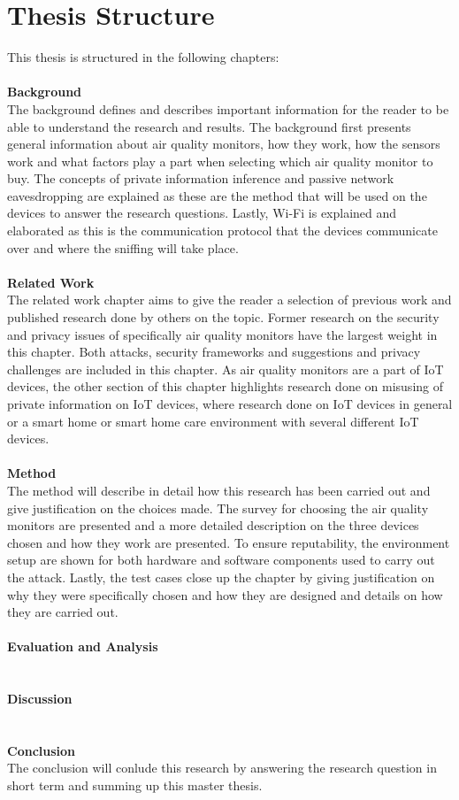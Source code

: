 \section{Thesis Structure}
This thesis is structured in the following chapters:\\\\
\textbf{Background}
\\
The background defines and describes important information for the reader to be able to understand the research and results. The background first presents general information about air quality monitors, how they work, how the sensors work and what factors play a part when selecting which air quality monitor to buy. The concepts of private information inference and passive network eavesdropping are explained as these are the method that will be used on the devices to answer the research questions. Lastly, Wi-Fi is explained and elaborated as this is the communication protocol that the devices communicate over and where the sniffing will take place. 
\\\\
\textbf{Related Work}
\\
The related work chapter aims to give the reader a selection of previous work and published research done by others on the topic. Former research on the security and privacy issues of specifically air quality monitors have the largest weight in this chapter. Both attacks, security frameworks and suggestions and privacy challenges are included in this chapter. As air quality monitors are a part of IoT devices, the other section of this chapter highlights research done on misusing of private information on IoT devices, where research done on IoT devices in general or a smart home or smart home care environment with several different IoT devices. 
\\\\
\textbf{Method}
\\
The method will describe in detail how this research has been carried out and give justification on the choices made. The survey for choosing the air quality monitors are presented and a more detailed description on the three devices chosen and how they work are presented. To ensure reputability, the environment setup are shown for both hardware and software components used to carry out the attack. Lastly, the test cases close up the chapter by giving justification on why they were specifically chosen and how they are designed and details on how they are carried out. 
\\\\
\textbf{Evaluation and Analysis}
\\
\\\\
\textbf{Discussion}
\\
\\\\
\textbf{Conclusion}
\\
The conclusion will conlude this research by answering the research question in short term and summing up this master thesis. 